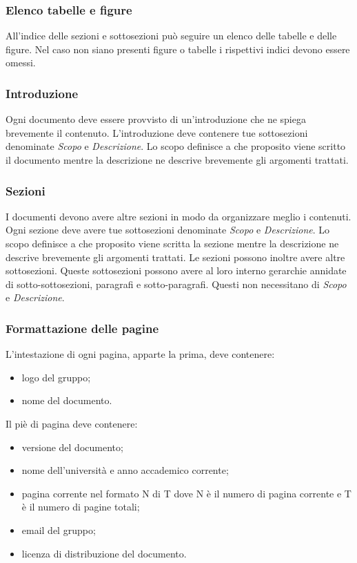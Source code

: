 \documentclass[12pt,a4paper]{article}
\begin{document}
\subsubsection{Elenco tabelle e figure}
All'indice delle sezioni e sottosezioni può seguire un elenco delle tabelle e delle figure. Nel caso non siano presenti figure o tabelle i rispettivi indici devono essere omessi.

\subsubsection{Introduzione}
Ogni documento deve essere provvisto di un'introduzione che ne spiega brevemente il contenuto. L'introduzione deve contenere tue sottosezioni denominate \emph{Scopo} e \emph{Descrizione}. Lo scopo definisce a che proposito viene scritto il documento mentre la descrizione ne descrive brevemente gli argomenti trattati.

\subsubsection{Sezioni}
I documenti devono avere altre sezioni in modo da organizzare meglio i contenuti. Ogni sezione deve avere tue sottosezioni denominate \emph{Scopo} e \emph{Descrizione}. Lo scopo definisce a che proposito viene scritta la sezione mentre la descrizione ne descrive brevemente gli argomenti trattati. Le sezioni possono inoltre avere altre sottosezioni. Queste sottosezioni possono avere al loro interno gerarchie annidate di sotto-sottosezioni,  paragrafi e sotto-paragrafi. Questi non necessitano di \emph{Scopo} e \emph{Descrizione}.

\subsubsection{Formattazione delle pagine}
L'intestazione di ogni pagina, apparte la prima, deve contenere:
\begin{itemize}
	\item logo del gruppo;
	\item nome del documento.
\end{itemize}
Il piè di pagina deve contenere:
\begin{itemize}
	\item versione del documento;
	\item nome dell'università e anno accademico corrente;
	\item pagina corrente nel formato N di T dove N è il numero di pagina corrente e T è il numero di pagine totali;
	\item email del gruppo;
	\item licenza di distribuzione del documento.
\end{itemize}
\end{document}
